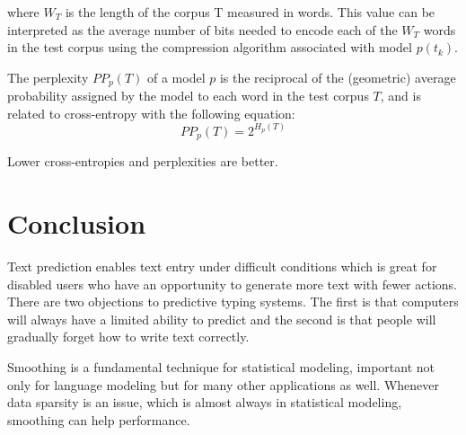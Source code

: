 \documentclass[10pt, a4paper]{article}
\begin{document}
where $W_{T}$ is the length of the corpus T measured in words. This value can be interpreted as the average number of bits needed to encode each of the $W_{T}$ words in the test corpus using the compression algorithm associated with model $p(t_{k})$.

The perplexity $PP_{p}(T)$ of a model $p$ is the reciprocal of the (geometric) average probability assigned by the model to each word in the test corpus $T$, and is related to cross-entropy with the following equation:
\begin{equation}
PP_{p} (T) = 2^{H_{p}(T)}
\end{equation}

Lower cross-entropies and perplexities are better.


\section{Conclusion}

Text prediction enables text entry under difficult conditions which is great for disabled users who have an opportunity to generate more text with fewer actions. There are two objections to predictive typing systems. The first is that computers will always have a limited ability to predict and the second is that people will gradually forget how to write text correctly.

Smoothing is a fundamental technique for statistical modeling, important not only for language modeling but for many other applications as well. Whenever data sparsity is an issue, which is almost always in statistical modeling, smoothing can help performance.

 

\nocite{*}
\end{document}
